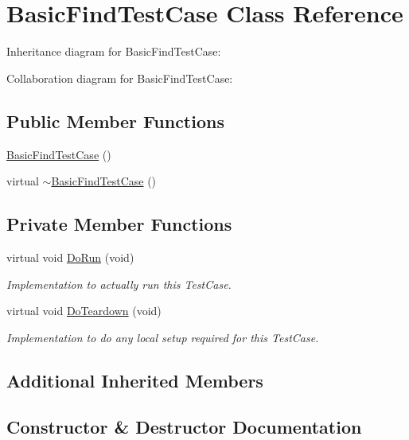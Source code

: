 \hypertarget{classBasicFindTestCase}{}\section{Basic\+Find\+Test\+Case Class Reference}
\label{classBasicFindTestCase}


Inheritance diagram for Basic\+Find\+Test\+Case\+:


Collaboration diagram for Basic\+Find\+Test\+Case\+:
\subsection*{Public Member Functions}
\begin{DoxyCompactItemize}
\item 
\hyperlink{classBasicFindTestCase_a3c0d4edab1c5a8cb95f4df9b954d4d68}{Basic\+Find\+Test\+Case} ()
\item 
virtual \hyperlink{classBasicFindTestCase_ab72077d9d1bc4492be2bfdeff8571fdf}{$\sim$\+Basic\+Find\+Test\+Case} ()
\end{DoxyCompactItemize}
\subsection*{Private Member Functions}
\begin{DoxyCompactItemize}
\item 
virtual void \hyperlink{classBasicFindTestCase_aa2a52ff104ae019ba54f1b761823b236}{Do\+Run} (void)
\begin{DoxyCompactList}\small\item\em Implementation to actually run this Test\+Case. \end{DoxyCompactList}\item 
virtual void \hyperlink{classBasicFindTestCase_a399c8159b9391b24655da1b8893fdaf9}{Do\+Teardown} (void)
\begin{DoxyCompactList}\small\item\em Implementation to do any local setup required for this Test\+Case. \end{DoxyCompactList}\end{DoxyCompactItemize}
\subsection*{Additional Inherited Members}


\subsection{Constructor \& Destructor Documentation}
